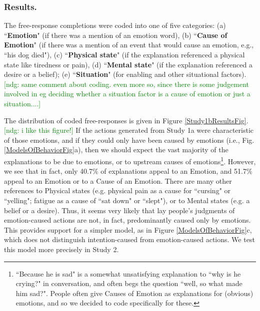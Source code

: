 \documentclass[10pt,letterpaper]{article}
\newcommand{\ndg}[1]{\textcolor{Green}{[ndg: #1]}}
\begin{document}
\subsubsection{Results.} 
The free-response completions were coded into one of five categories: (a) ``\textbf{Emotion}" (if there was a mention of an emotion word), (b) ``\textbf{Cause of Emotion}" (if there was a mention of an event that would cause an emotion, e.g., ``his dog died"), (c) ``\textbf{Physical state}" (if the explanation referenced a physical state like tiredness or pain), (d) ``\textbf{Mental state}" (if the explanation referenced a desire or a belief); (e) ``\textbf{Situation}" (for enabling and other situational factors). 
\ndg{same comment about coding. even more so, since there is some judgement involved in eg deciding whether a situation factor is a cause of emotion or just a situation....}

The distribution of coded free-responses is given in Figure \ref{Study1bResultsFig}. \ndg{i like this figure!}
If the actions generated from Study 1a were characteristic of those emotions, and if they could only have been caused by emotions (i.e., Fig. \ref{ModelsOfBehaviorFig}a), then we should expect the vast majority of the explanations to be due to emotions, or to upstream causes of emotions\footnote{``Because he is sad" is a somewhat unsatisfying explanation to ``why is he crying?" in conversation, and often begs the question ``well, so what made him sad?". People often give Causes of Emotion as explanations for (obvious) emotions, and so we decided to code specifically for these.}. However, we see that in fact, only 40.7\% of explanations appeal to an Emotion, and 51.7\% appeal to an Emotion or to a Cause of an Emotion. There are many other references to Physical states (e.g. physical pain as a cause for ``cursing" or ``yelling"; fatigue as a cause of ``sat down" or ``slept"), or to Mental states (e.g. a belief or a desire). Thus, it seems very likely that lay people's judgments of emotion-caused actions are not, in fact, predominantly caused only by emotions. 
This provides support for a simpler model, as in Figure \ref{ModelsOfBehaviorFig}c, which does not distinguish intention-caused from emotion-caused actions. 
We test this model more precisely in Study 2.
\end{document}
